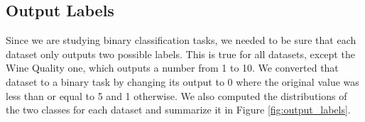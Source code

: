 \documentclass[conference]{IEEEtran}
\begin{document}
\subsection{Output Labels}

Since we are studying binary classification tasks, we needed to be sure that each dataset only outputs two possible labels. This is true for all datasets, except the Wine Quality one, which outputs a number from 1 to 10. We converted that dataset to a binary task by changing its output to 0 where the original value was less than or equal to 5 and 1 otherwise. We also computed the distributions of the two classes for each dataset and summarize it in Figure \ref{fig:output_labels}.

\begin{figure}%
\centering
{}%
\hspace{8pt}%
\subfigure[b]{%
\label{fig:ex3-b}%
}
\end{figure}
\end{document}
